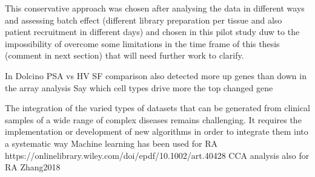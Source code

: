 This conservative approach was chosen after analysing the data in different ways and assessing batch effect (different library preparation per tissue and also patient recruitment in different days) and chosen in this pilot study duw to the impossibility of overcome some limitations in the time frame of this thesis (comment in next section) that will need further work to clarify.




In Dolcino PSA vs HV SF comparison also detected more up genes than down in the array analysis
Say which cell types drive more the top changed gene





The integration of the varied types of datasets that can be generated from clinical samples of a wide range of complex diseases remains challenging. It requires the implementation or development of new algorithms in order to integrate them into a systematic way
Machine learning has been used for RA https://onlinelibrary.wiley.com/doi/epdf/10.1002/art.40428
CCA analysis also for RA Zhang2018	




